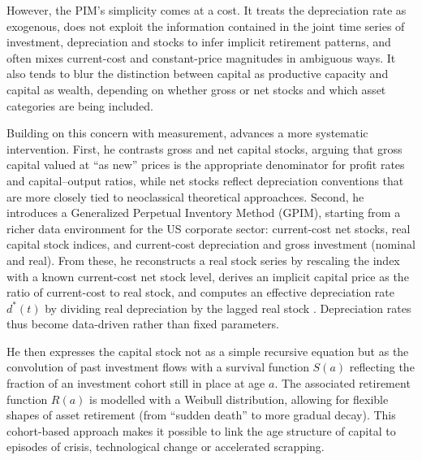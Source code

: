 \documentclass[11pt,a4paper]{article}
\begin{document}
However, the PIM's simplicity comes at a cost. It treats the depreciation rate as exogenous, does not exploit the information contained in the joint time series of investment, depreciation and stocks to infer implicit retirement patterns, and often mixes current-cost and constant-price magnitudes in ambiguous ways. It also tends to blur the distinction between capital as productive capacity and capital as wealth, depending on whether gross or net stocks and which asset categories are being included. 

Building on this concern with measurement, \citet[Appendix 6.3]{Shaikh2016} advances a more systematic intervention. First, he contrasts gross and net capital stocks, arguing that gross capital valued at “as new” prices is the appropriate denominator for profit rates and capital–output ratios, while net stocks reflect depreciation conventions that are more closely tied to neoclassical theoretical approachces. Second, he introduces   a Generalized Perpetual Inventory Method (GPIM), starting from a richer data environment for the US corporate sector: current-cost net stocks, real capital stock indices, and current-cost depreciation and gross investment (nominal and real). From these, he reconstructs a real stock series by rescaling the index with a known current-cost net stock level, derives an implicit capital price as the ratio of current-cost to real stock, and computes an effective depreciation rate $d^{*}(t)$ by dividing real depreciation by the lagged real stock \citep[Appendix 6.5]{Shaikh2016}. Depreciation rates thus become data-driven rather than fixed parameters.

He then expresses the capital stock not as a simple recursive equation but as the convolution of past investment flows with a survival function $S(a)$ reflecting the fraction of an investment cohort still in place at age $a$. The associated retirement function $R(a)$ is modelled with a Weibull distribution, allowing for flexible shapes of asset retirement (from ``sudden death'' to more gradual decay). This cohort-based approach makes it possible to link the age structure of capital to episodes of crisis, technological change or accelerated scrapping.
\end{document}
